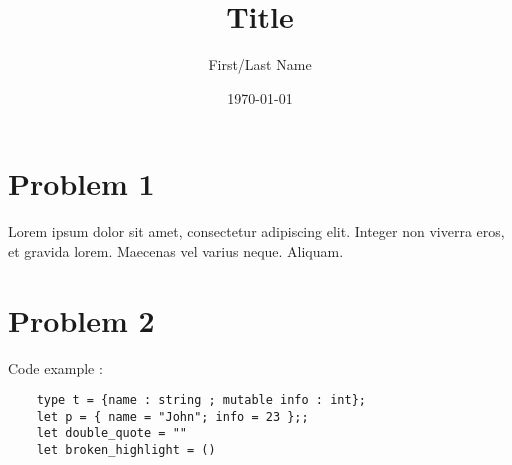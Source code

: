 \documentclass{article}
\title{Title}
\date{\today}
\author{First/Last Name}
\begin{document}
\thispagestyle{firstpage}

\begin{center}
    \huge\bfseries{\@title}
\end{center}

\section{Problem 1}

Lorem ipsum dolor sit amet, consectetur adipiscing elit. Integer non viverra 
eros, et gravida lorem. Maecenas vel varius neque. Aliquam.

\section{Problem 2}

Code example : 
\begin{verbatim}
    type t = {name : string ; mutable info : int};
    let p = { name = "John"; info = 23 };;
    let double_quote = ""
    let broken_highlight = ()
\end{verbatim}
\end{document}
